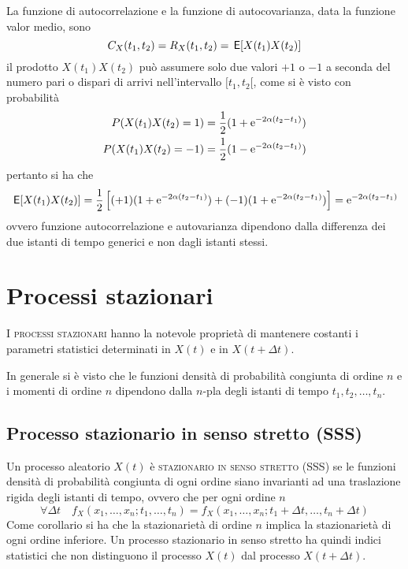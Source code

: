 La funzione di autocorrelazione e la funzione di autocovarianza, data la funzione valor medio, sono \[C_X(t_1,t_2)=R_X(t_1,t_2)=\,{\operatorname{\mathsf{E}}}\!\left[{X(t_1)X(t_2)}\right]\]
il prodotto $X(t_1)X(t_2)$ può assumere solo due valori $+1$ o $-1$ a seconda del numero pari o dispari di arrivi nell'intervallo $[t_1,t_2[$, come si è visto con probabilità
\[\begin{split}P(X(t_1)X(t_2)=1)&=\frac{1}{2}(1+\operatorname{e}^{-2\alpha(t_2-t_1)})\\
P(X(t_1)X(t_2)=-1)&=\frac{1}{2}(1-\operatorname{e}^{-2\alpha(t_2-t_1)})\end{split}\]
pertanto si ha che
\begin{equation}\begin{split}\,{\operatorname{\mathsf{E}}}\!\left[{X(t_1)X(t_2)}\right]=\frac{1}{2}\left[(+1)(1+\operatorname{e}^{-2\alpha(t_2-t_1)})+(-1)(1+\operatorname{e}^{-2\alpha(t_2-t_1)})\right]=\operatorname{e}^{-2\alpha(t_2-t_1)}\end{split}\end{equation}
ovvero funzione autocorrelazione e autovarianza dipendono dalla differenza dei due istanti di tempo generici e non dagli istanti stessi.

\section{Processi stazionari}
I \textsc{processi stazionari} hanno la notevole proprietà di mantenere costanti i parametri statistici determinati in $X(t)$ e in $X(t+\Delta t)$. 

In generale si è visto che le funzioni densità di probabilità congiunta di ordine $n$ e i momenti di ordine $n$ dipendono dalla $n$-pla degli istanti di tempo $t_1,t_2,\dots,t_n$.

\subsection{Processo stazionario in senso stretto (SSS)}
Un processo aleatorio $X(t)$ è \textsc{stazionario in senso stretto (SSS)} se le funzioni densità di probabilità congiunta di ogni ordine siano invarianti ad una traslazione rigida degli istanti di tempo, ovvero che per ogni ordine $n$
\begin{equation}
\forall\Delta t\quad f_X(x_1,\dots,x_n;t_1,\dots,t_n)=f_X(x_1,\dots,x_n;t_1+\Delta t,\dots,t_n+\Delta t)
\end{equation}
Come corollario si ha che la stazionarietà di ordine $n$ implica la stazionarietà di ogni ordine inferiore.
Un processo stazionario in senso stretto ha quindi indici statistici che non distinguono il processo $X(t)$ dal processo $X(t+\Delta t)$.


